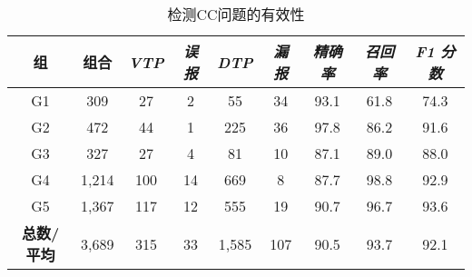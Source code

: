 \begin{table}[t]
	\centering
	\begin{threeparttable}
	\caption{\tool{}检测CC问题的有效性}
	\label{tab:RQ4}
	\begin{tabularx}{0.86\textwidth}{@{}ccccccccc@{}}
		\toprule
		\textbf{组}& \textbf{组合}& \textbf{\textit{VTP}} & \textbf{\textit{误报}} & \textbf{\textit{DTP}} & \textbf{\textit{漏报}} & \textbf{\textit{精确率}} & \textbf{\textit{召回率}} & \textbf{\textit{F1 分数}} \\ 
		\midrule
		G1    &  309   & 27   & 2   & 55   & 34  &  93.1 & 61.8  &  74.3  \\
		G2    &  472   & 44   & 1   & 225  & 36  &  97.8 & 86.2  &  91.6  \\
		G3    &  327   & 27   & 4   & 81   & 10  &  87.1 & 89.0  &  88.0  \\
		G4    &  1,214  & 100  & 14  & 669  & 8   &  87.7 & 98.8  &  92.9  \\
		G5    &  1,367  & 117  & 12  & 555  & 19  &  90.7 & 96.7  &  93.6  \\
		\midrule
		\textbf{总数/平均}  & 3,689  & 315 & 33 & 1,585 & 107 & 90.5 &  93.7 & 92.1   \\
		\bottomrule
	\end{tabularx}
	\end{threeparttable}
\end{table}